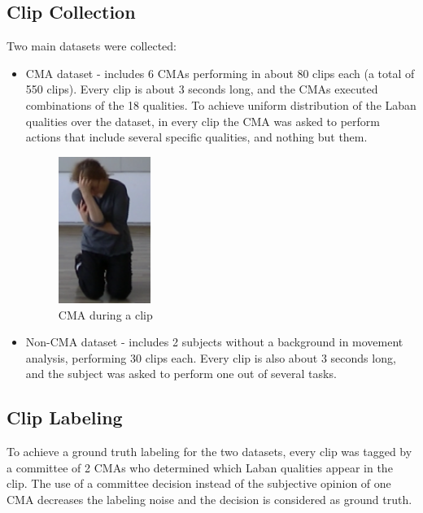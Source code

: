 \documentclass[11pt,twocolumn,varwidth=true,a4paper,fleqn]{article}
\begin{document}
\subsection{Clip Collection}
Two main datasets were collected: 
\begin{itemize}
  	\item 
	 CMA dataset - includes 6 CMAs performing in about
	80 clips each (a total of 550 clips). Every clip is about 3 seconds long, and the CMAs executed combinations of the 18 qualities. 
	To achieve uniform distribution of the Laban qualities over the dataset, in every 
	clip the CMA was asked to perform actions that include several specific qualities, 
	and nothing but them.
	
	\begin{figure}[h]
	\centering
	\includegraphics[width=30mm]{Rachelle.png}
	\caption{CMA during a clip}
	\label{Rachelle}
	\end{figure}
	
	\item 
	Non-CMA dataset - includes 2 subjects without a background in movement
	analysis, performing 30 clips each. Every clip is also about 3 seconds long,
	and the subject was asked to perform one out of several
	tasks.
\end{itemize}
\subsection{Clip Labeling}
To achieve a ground truth labeling for the two datasets, every clip was tagged by
a committee of 2 CMAs who determined which Laban qualities appear in the
clip. The use of a committee decision instead of the subjective opinion of one
CMA decreases the labeling noise and the decision is considered as ground truth.
\end{document}
